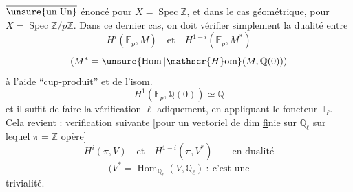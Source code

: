 $\overline{\text{\unsure{un|Un}}}$ énoncé pour $X=\operatorname{Spec}\mathbb{Z}$, et dans le cas géométrique, pour $X=\operatorname{Spec}\mathbb{Z}/p\mathbb{Z}$. Dans ce dernier cas, on doit vérifier simplement la dualité entre
\[
H^i(\mathbb{F}_p,M)\quad\text{et}\quad H^{1-i}(\mathbb{F}_p,M^*)
\]
\[
(M^*=\unsure{\operatorname{Hom}|\mathscr{H}\mathrm{om}}(M,\mathbb{Q}(0)))
\]
à l'aide  ``\uline{cup-produit}'' et de l'isom.
\[
H^1(\mathbb{F}_p,\mathbb{Q}(0))\simeq\mathbb{Q}
\]
et il suffit de faire la vérification $\ell$-adiquement, en appliquant le foncteur $\mathbb{T}_\ell$. Cela revient :  verification suivante [pour un vectoriel de dim \uline{f}inie sur $\mathbb{Q}_\ell$ sur lequel $\pi=\mathbb{Z}$ opère]
\[
H^i(\pi,V)\quad\text{et}\quad H^{1-i}(\pi,V^*)\qquad\text{en dualité}
\]
\[
(V^*=\operatorname{Hom}_{\mathbb{Q}_\ell}(V,\mathbb{Q}_\ell)\ :\ \text{c'est une}
\]
trivialité.
